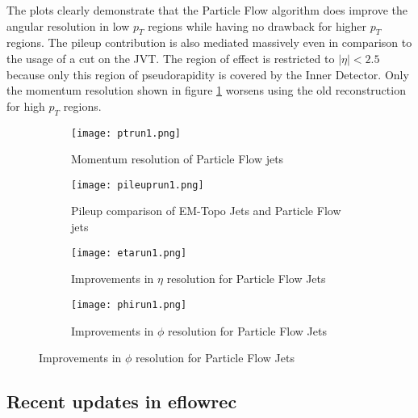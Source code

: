The plots clearly demonstrate that the Particle Flow algorithm does improve the angular resolution in low $p_T$ regions while having no drawback for higher $p_T$ regions. The pileup contribution is also mediated massively even in comparison to the usage of a cut on the JVT. The region of effect is restricted to $|\eta|<\num{2.5}$ because only this region of pseudorapidity is covered by the Inner Detector. Only the momentum resolution shown in figure \ref{fig:ptrun1} worsens using the old reconstruction for high $p_T$ regions.


\begin{figure}[h]
  \centering
  \begin{subfigure}[b]{0.5\figwidth}
\texttt{[image: ptrun1.png]}
\caption[Momentum resolution of Particle Flow]{Momentum resolution of Particle Flow jets \cite{pflow16}}
\label{fig:ptrun1}
\end{subfigure}
\quad
  \begin{subfigure}[b]{0.5\figwidth}
  \texttt{[image: pileuprun1.png]}
  \caption[Pileup comparison of EM-Topo Jets and Particle Flow jets]{Pileup comparison of EM-Topo Jets and Particle Flow jets \cite{pflow16}}
  \label{fig:pileuprun1}
  \end{subfigure}



  \begin{subfigure}[b]{0.5\figwidth}
  \texttt{[image: etarun1.png]}
  \caption[Improvements in $\eta$ resolution for Particle Flow Jets]{Improvements in $\eta$ resolution for Particle Flow Jets \cite{pflow16}}
  \label{fig:etarun1}
  \end{subfigure}
  \quad
  \begin{subfigure}[b]{0.5\figwidth}
  \texttt{[image: phirun1.png]}
  \caption[Improvements in $\phi$ resolution for Particle Flow Jets]{Improvements in $\phi$ resolution for Particle Flow Jets \cite{pflow16}}
  \label{fig:phirun1}
  \end{subfigure}
\end{figure}





\subsection{Recent updates in eflowrec}

